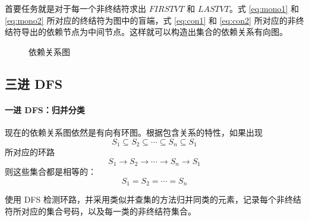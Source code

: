 \documentclass[UTF8]{article}
\begin{document}
首要任务就是对于每一个非终结符求出 $\textit{FIRSTVT}$ 和 $\textit{LASTVT}$。式 \eqref{eq:mono1} 和 \eqref{eq:mono2} 所对应的终结符为图中的盲端，式 \eqref{eq:con1} 和 \eqref{eq:con2} 所对应的非终结符导出的依赖节点为中间节点。这样就可以构造出集合的依赖关系有向图。

\begin{figure}[h]
    \centering
    \caption{依赖关系图}
\end{figure}

\subsection{三进 DFS}

\paragraph{一进 DFS：归并分类} 现在的依赖关系图依然是有向有环图。根据包含关系的特性，如果出现
\begin{equation*}
    S_1 \subseteq S_2 \subseteq \cdots \subseteq S_n \subseteq S_1
\end{equation*}
所对应的环路
\begin{equation*}
    S_1 \rightarrow S_2 \rightarrow \cdots \rightarrow S_n \rightarrow S_1
\end{equation*}
则这些集合都是相等的：
\begin{equation*}
    S_1 = S_2 = \cdots = S_n
\end{equation*}

使用 DFS 检测环路，并采用类似并查集的方法归并同类的元素，记录每个非终结符所对应的集合号码，以及每一类的非终结符集合。

\begin{table}[h]
    \centering
    \caption{类别号码}\label{tab:num}
\end{table}
\end{document}
